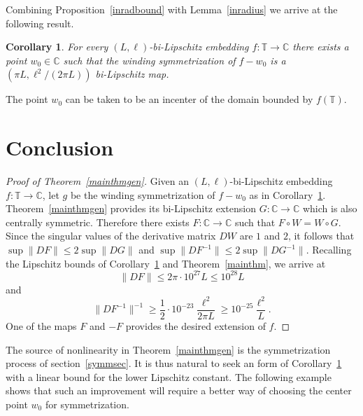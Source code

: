 \documentclass[11pt]{amsart}
\newtheorem{corollary}[theorem]{Corollary}
\theoremstyle{remark}
\numberwithin{equation}{section}
\newcommand{\C}{\mathbb{C}}
\newcommand{\T}{\mathbb{T}}
\newcommand{\norm}[1]{\lVert#1\rVert}
\begin{document}
Combining Proposition~\ref{inradbound} with Lemma~\ref{inradius} we arrive at the following result.

\begin{corollary}\label{windBL} For every $(L,\ell)$-bi-Lipschitz embedding $f\colon \T\to\C$ there exists a point $w_0\in\C$ such that the winding symmetrization of $f-w_0$ is a $(\pi L, \ell^2/(2\pi L))$ bi-Lipschitz map.
\end{corollary}

The point $w_0$ can be taken to be an incenter of the domain bounded by $f(\T)$. 

\section{Conclusion}\label{concludesec}

\begin{proof}[Proof of Theorem~\ref{mainthmgen}] Given an $(L,\ell)$-bi-Lipschitz embedding $f\colon \T\to\C$, let $g$ be the winding symmetrization of $f-w_0$ as in Corollary~\ref{windBL}. Theorem~\ref{mainthmgen} provides 
its bi-Lipschitz extension $G\colon \C\to \C$ which is also centrally symmetric. Therefore there exists $F\colon \C\to\C$ such that $F\circ W = W\circ G$. Since the singular values of the derivative matrix $DW$ are $1$ and $2$, it follows that $\sup \norm{DF} \le 2\sup\norm{DG}$ and $\sup \norm{DF^{-1}} \le 2\sup\norm{DG^{-1}}$. Recalling the Lipschitz bounds of  Corollary~\ref{windBL} and Theorem~\ref{mainthm}, we arrive at 
\[
\norm{DF} \le 2\pi\cdot 10^{27}L \le 10^{28}L
\]
and
\[\norm{DF^{-1}}^{-1}\ge \frac12\cdot  10^{-23}\frac{\ell^2}{2\pi L} \ge 10^{-25}\frac{\ell^2}{L}.
\]
One of the maps $F$ and $-F$ provides the desired extension of $f$. 
\end{proof}

The source of   nonlinearity in Theorem~\ref{mainthmgen} is the symmetrization process of section~\ref{symmsec}.  
It is thus natural to seek an form of Corollary~\ref{windBL} with a linear bound for the lower Lipschitz constant. The following example shows that such an improvement will require a better way of choosing the center point $w_0$ for symmetrization. 
\end{document}
